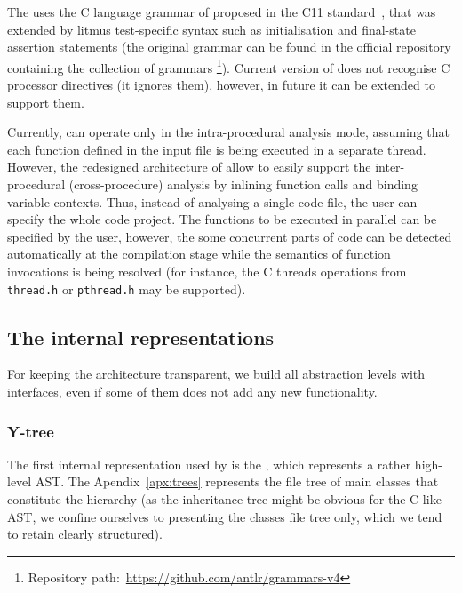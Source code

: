 The \porthos[2] uses the C language grammar of proposed in the C11 standard~\cite{jtc2011sc22}, that was extended by litmus test-specific syntax such as initialisation and final-state assertion statements (the original  grammar can be found in the official repository containing the collection of  grammars%
\footnote{Repository path:~\url{https://github.com/antlr/grammars-v4}}).%
Current version of \porthos[2] does not recognise C processor directives (it ignores them), however, in future it can be extended to support them.

Currently, \porthos[2] can operate only in the intra-procedural analysis mode, assuming that each function defined in the input file is being executed in a separate thread.
However, the redesigned architecture of \porthos[2] allow to easily support the inter-procedural (cross-procedure) analysis by inlining function calls and binding variable contexts.
Thus, instead of analysing a single code file, the user can specify the whole code project.
The functions to be executed in parallel can be specified by the user, however, the some concurrent parts of code can be detected automatically at the compilation stage while the semantics of function invocations is being resolved (for instance, the C threads operations from \texttt{thread.h} or \texttt{pthread.h} may be supported).



\subsection{The internal representations}
\label{ch:impl:model}

For keeping the architecture transparent, we build all abstraction levels with interfaces, even if some of them does not add any new functionality.%

\subsubsection{Y-tree}
\label{ch:impl:model:ytree}

The first internal representation used by \porthos[2] is the \textit{\ytree{}}, which represents a rather high-level AST.
The Apendix~\ref{apx:trees} represents the file tree of main classes that constitute the \ytree{} hierarchy (as the inheritance tree might be obvious for the C-like AST, we confine ourselves to presenting the classes file tree only, which we tend to retain clearly structured).

